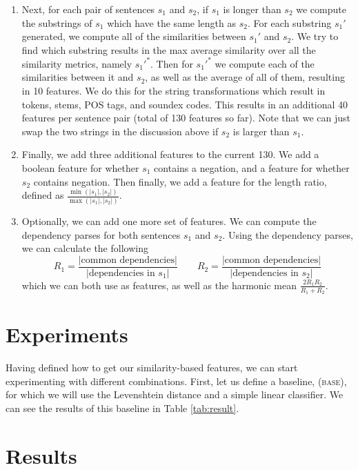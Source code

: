 \documentclass[11pt, reqno]{amsart}
\begin{document}
\begin{enumerate}
	\item Next, for each pair of sentences $s_1$ and $s_2$, if $s_1$ is longer than $s_2$ we compute the substrings of $s_1$ which have the same length as $s_2$. For each substring $s_1'$ generated, we compute all of the similarities between $s_1'$ and $s_2$. We try to find which substring results in the max average similarity over all the similarity metrics, namely $s_1'^*$. Then for $s_1'^*$ we compute each of the similarities between it and $s_2$, as well as the average of all of them, resulting in 10 features. We do this for the string transformations which result in tokens, stems, POS tags, and soundex codes. This results in an additional 40 features per sentence pair (total of 130 features so far). Note that we can just swap the two strings in the discussion above if $s_2$ is larger than $s_1$. 
	
	\item Finally, we add three additional features to the current 130. We add a boolean feature for whether $s_1$ contains a negation, and a feature for whether $s_2$ contains negation. Then finally, we add a feature for the length ratio, defined as $\frac{\min(|s_1|, |s_2|)}{\max(|s_1|, |s_2|)}$.
	
	\item Optionally, we can add one more set of features. We can compute the dependency parses for both sentences $s_1$ and $s_2$. Using the dependency parses, we can calculate the following
	$$R_1 = \frac{|\text{common dependencies}|}{|\text{dependencies in }s_1|} \qquad R_2 = \frac{|\text{common dependencies}|}{|\text{dependencies in }s_2|}$$
	which we can both use as features, as well as the harmonic mean $\frac{2R_1R_2}{R_1 + R_2}$. 
	\end{enumerate}
	
	\section{Experiments}
	
	Having defined how to get our similarity-based features, we can start experimenting with different combinations. First, let us define a baseline, (\textsc{base}), for which we will use the Levenshtein distance and a simple linear classifier. We can see the results of this baseline in Table \ref{tab:result}.
	
	\section{Results}
	
\end{document}
